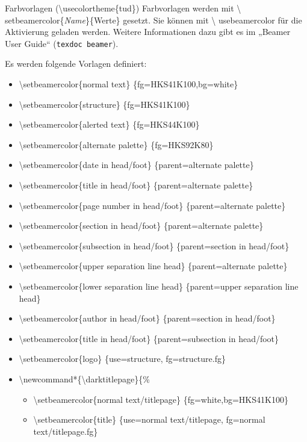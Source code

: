 \documentclass[presentation,t]{beamer}
\begin{document}
\begin{frame}[allowframebreaks]{Farbvorlagen (\textbackslash usecolortheme\{tud\})}
Farbvorlagen werden mit \textbackslash
setbeamercolor\{\emph{Name}\}\{Werte\} gesetzt. Sie können mit \textbackslash
usebeamercolor für die Aktivierung geladen werden. Weitere Informationen dazu gibt es im
„Beamer User Guide“ (\texttt{texdoc beamer}).

Es werden folgende Vorlagen definiert:
\begin{itemize}
\item \textbackslash setbeamercolor\{normal text\} \{fg=HKS41K100,bg=white\}
\item \textbackslash setbeamercolor\{structure\} \{fg=HKS41K100\}
\item \textbackslash setbeamercolor\{alerted text\} \{fg=HKS44K100\}
\item \textbackslash setbeamercolor\{alternate palette\} \{fg=HKS92K80\}
\item \textbackslash setbeamercolor\{date in head/foot\} \{parent=alternate palette\}
\item \textbackslash setbeamercolor\{title in head/foot\} \{parent=alternate palette\}
\item \textbackslash setbeamercolor\{page number in head/foot\} \{parent=alternate palette\}
\item \textbackslash setbeamercolor\{section in head/foot\} \{parent=alternate palette\}
\item \textbackslash setbeamercolor\{subsection in head/foot\} \{parent=section in head/foot\}
\item \textbackslash setbeamercolor\{upper separation line head\} \{parent=alternate palette\}
\item \textbackslash setbeamercolor\{lower separation line head\} \{parent=upper separation line head\}
\item \textbackslash setbeamercolor\{author in head/foot\} \{parent=section in head/foot\}
\item \textbackslash setbeamercolor\{title in head/foot\} \{parent=subsection in head/foot\}
\item \textbackslash setbeamercolor\{logo\} \{use=structure, fg=structure.fg\}
\item \textbackslash newcommand*\{\textbackslash darktitlepage\}\{\%
\begin{itemize}
\item \textbackslash setbeamercolor\{normal text/titlepage\} \{fg=white,bg=HKS41K100\}%
\item \textbackslash setbeamercolor\{title\} \{use=normal text/titlepage, fg=normal text/titlepage.fg\}%

\end{itemize}
\end{itemize}
\end{frame}
\end{document}
